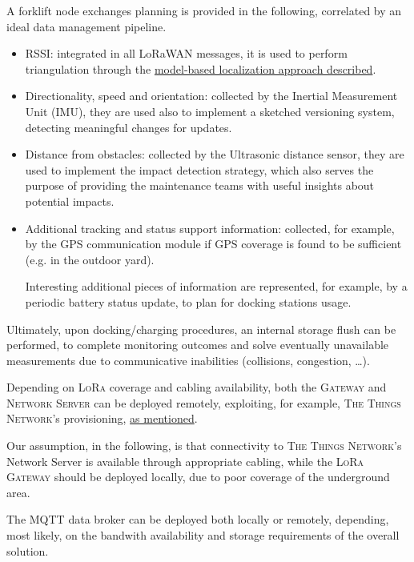 \documentclass[a4paper,11pt]{article} %
\begin{document}
A forklift node exchanges planning is provided in the following, correlated by an ideal data management pipeline.

\begin{itemize}
    \item RSSI: integrated in all LoRaWAN messages, it is used to perform triangulation through the \hyperref[triangulation]{model-based localization approach described}.
    \item Directionality, speed and orientation: collected by the Inertial Measurement Unit (IMU), they are used also to implement a sketched versioning system, detecting meaningful changes for updates.
    \item Distance from obstacles: collected by the Ultrasonic distance sensor, they are used to implement the impact detection strategy, which also serves the purpose of providing the maintenance teams with useful insights about potential impacts.
    \item Additional tracking and status support information: collected, for example, by the GPS communication module if GPS coverage is found to be sufficient (e.g. in the outdoor yard).

        Interesting additional pieces of information are represented, for example, by a periodic battery status update, to plan for docking stations usage.
\end{itemize}

Ultimately, upon docking/charging procedures, an internal storage flush can be performed, to complete monitoring outcomes and solve eventually unavailable measurements due to communicative inabilities (collisions, congestion, \dots).

\medskip

Depending on \textsc{LoRa} coverage and cabling availability, both the \textsc{Gateway} and \textsc{Network Server} can be deployed remotely, exploiting, for example, \textsc{The Things Network}'s provisioning, \hyperref[ttn]{as mentioned}.

\smallskip

Our assumption, in the following, is that connectivity to \textsc{The Things Network}'s Network Server is available through appropriate cabling, while the \textsc{LoRa Gateway} should be deployed locally, due to poor coverage of the underground area.

\medskip

The \textsc{MQTT} data broker can be deployed both locally or remotely, depending, most likely, on the bandwith availability and storage requirements of the overall solution.
\end{document}
